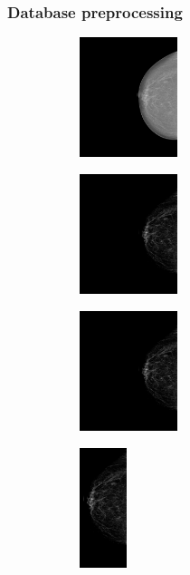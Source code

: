\documentclass{beamer}
\begin{document}
	\begin{frame}
		\frametitle{Database preprocessing}
		\begin{figure}[h]
		\centering
			\begin{subfigure}{0.24\textwidth}
				\centering
					\includegraphics[height=3.5cm]{plots/mammogram.png}
			\end{subfigure}
			\begin{subfigure}{0.24\textwidth}
				\centering
					\includegraphics[height=3.5cm]{plots/mammogram_enhanced.png}
			\end{subfigure}
			\begin{subfigure}{0.24\textwidth}
				\centering
					\includegraphics[height=3.5cm]{plots/mammogram_resized.png}
			\end{subfigure}
			\begin{subfigure}{0.11\textwidth}
				\centering
					\includegraphics[height=3.5cm]{plots/mammogram_v1.png}
			\end{subfigure}
			~
			\begin{subfigure}{0.24\textwidth}

\end{subfigure}
\end{figure}
\end{frame}
\end{document}

